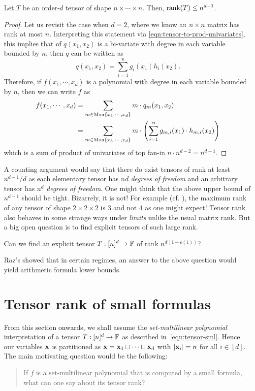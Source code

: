 \begin{lemma}\label{lem:tensor-rank-trivial-upperbound}
  Let $T$ be an order-$d$ tensor of shape $n\times \cdots \times n$.
Then, $\operatorname{rank}(T) \leq n^{d-1}$.
\end{lemma}
\begin{proof}
  Let us revisit the case when $d=2$, where we know an $n\times n$ matrix has rank at most $n$.
Interpreting this statement via \eqref{eqn:tensor-to-prod-univariates}, this implies that of $q(x_1,x_2)$ is a bi-variate with degree in each variable bounded by $n$, then $q$ can be written as
\[
q(x_1,x_2) = \sum_{i=1}^n g_i(x_1) h_i(x_2).
\]
Therefore, if $f(x_1,\cdots, x_d)$ is a polynomial with degree in each variable bounded by $n$, then we can write $f$ as
\begin{align*}
f(x_1,\cdots, x_d) &= \sum_{m \in \mathrm{Mon}\left\{x_3,\cdots, x_d\right\}} m \cdot q_m(x_1,x_2)\\
& = \sum_{m \in \mathrm{Mon}\left\{x_3,\cdots, x_d\right\}} m \cdot \left(\sum_{i=1}^n g_{m,i}(x_1) \cdot h_{m,i}(x_2)\right)
\end{align*}
which is a sum of product of univariates of top fan-in $n \cdot n^{d-2} = n^{d-1}$. 
\end{proof}

A counting argument would say that there do exist tensors of rank at least $n^{d-1}/d$ as each elementary tensor has $nd$ \emph{degrees of freedom} and an arbitrary tensor has $n^d$ \emph{degrees of freedom}.
One might think that the above upper bound of $n^{d-1}$ should be tight.
Bizarrely, it is not!
For example (cf.
\cite{p85}), the maximum rank of any tensor of shape $2\times 2 \times 2$ is $3$ and not $4$ as one might expect!
Tensor rank also behaves in some strange ways under \emph{limits} unlike the usual matrix rank.
But a big open question is to find explicit tensors of such large rank.

\begin{openproblem}
Can we find an explicit tensor $T: [n]^d \rightarrow \mathbb{F}$ of rank $n^{d(1 - o(1))}$?
\end{openproblem}

Raz's \cite{raz10} showed that in certain regimes, an answer to the above question would yield arithmetic formula lower bounds. 

\section{Tensor rank of small formulas}

From this section onwards, we shall assume the \emph{set-multilinear polynomial} interpretation of a tensor $T:[n]^d \rightarrow \mathbb{F}$ as described in~\eqref{eqn:tensor-sml}.
Hence our variables $\mathbf{x}$ is partitioned as $\mathbf{x} = \mathbf{x}_1 \sqcup \cdots \sqcup \mathbf{x}_d$ with $\left|\mathbf{x}_i\right| = n$ for all $i\in [d]$.
The main motivating question would be the following:
\begin{quote}
If $f$ is a set-multilinear polynomial that is computed by a small formula, what can one say about its tensor rank?
\end{quote}

